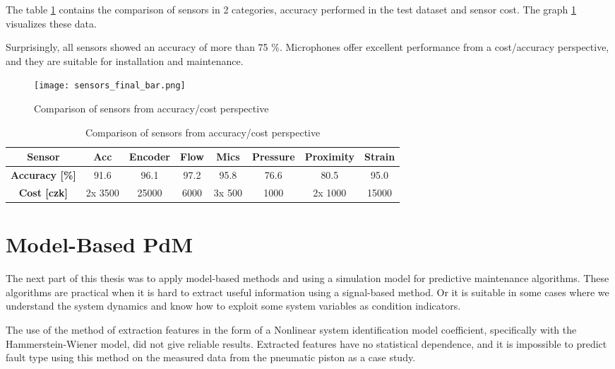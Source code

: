 The table \ref{tab:sensors_final} contains the comparison of sensors in 2
categories, accuracy performed in the test dataset and sensor cost. The
graph \ref{fig:sensors_final_bar} visualizes these data.

Surprisingly, all sensors showed an accuracy of more than 75 \%. Microphones
offer excellent performance from a cost/accuracy perspective, and they are
suitable for installation and maintenance.

\begin{figure}[h!]
    \centering
    \texttt{[image: sensors\_final\_bar.png]}
    \caption{Comparison of sensors from accuracy/cost perspective}
    \label{fig:sensors_final_bar}
\end{figure}

\begin{table}[h]
    \centering
    \begin{tabular}{|c|c|c|c|c|c|c|c|}
        \hline
        \textbf{Sensor}   & Acc & Encoder & Flow & Mics & Pressure & Proximity & Strain \\
        \hline
        \textbf{Accuracy [\%]} & 91.6 & 96.1 & 97.2 & 95.8 & 76.6 & 80.5 & 95.0 \\
        \hline
        \textbf{Cost [czk]} & 2x 3500 & 25000 & 6000 & 3x 500 & 1000 & 2x 1000 & 15000 \\
        \hline
    \end{tabular}
    \caption{Comparison of sensors from accuracy/cost perspective}
    \label{tab:sensors_final}
\end{table}

\section{Model-Based PdM}

The next part of this thesis was to apply model-based methods and using a
simulation model for predictive maintenance algorithms. These algorithms
are practical when it is hard to extract useful information using a
signal-based method. Or it is suitable in some cases where we understand
the system dynamics and know how to exploit some system variables as
condition indicators.

The use of the method of extraction features in the form of a Nonlinear
system identification model coefficient, specifically with the
Hammerstein-Wiener model, did not give reliable results. Extracted features
have no statistical dependence, and it is impossible to predict fault type
using this method on the measured data from the pneumatic piston as a case
study.

